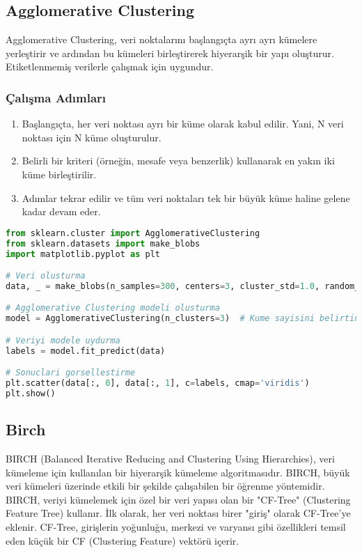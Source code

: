 \subsection{Agglomerative Clustering}
Agglomerative Clustering, veri noktalarını başlangıçta ayrı ayrı kümelere yerleştirir ve ardından bu kümeleri birleştirerek hiyerarşik bir yapı oluşturur. Etiketlenmemiş verilerle çalışmak için uygundur.

\subsubsection{Çalışma Adımları}
\begin{enumerate}
    \item Başlangıçta, her veri noktası ayrı bir küme olarak kabul edilir. Yani, N veri noktası için N küme oluşturulur.
    \item Belirli bir kriteri (örneğin, mesafe veya benzerlik) kullanarak en yakın iki küme birleştirilir.
    \item Adımlar tekrar edilir ve tüm veri noktaları tek bir büyük küme haline gelene kadar devam eder.
\end{enumerate}

\begin{lstlisting}[language=Python, caption=Scikit-learn'de AgglomerativeClustering.]
from sklearn.cluster import AgglomerativeClustering
from sklearn.datasets import make_blobs
import matplotlib.pyplot as plt

# Veri olusturma
data, _ = make_blobs(n_samples=300, centers=3, cluster_std=1.0, random_state=42)

# Agglomerative Clustering modeli olusturma
model = AgglomerativeClustering(n_clusters=3)  # Kume sayisini belirtin

# Veriyi modele uydurma
labels = model.fit_predict(data)

# Sonuclari gorsellestirme
plt.scatter(data[:, 0], data[:, 1], c=labels, cmap='viridis')
plt.show()
\end{lstlisting}

\subsection{Birch}
BIRCH (Balanced Iterative Reducing and Clustering Using Hierarchies), veri kümeleme için kullanılan bir hiyerarşik kümeleme algoritmasıdır. BIRCH, büyük veri kümeleri üzerinde etkili bir şekilde çalışabilen bir öğrenme yöntemidir. BIRCH, veriyi kümelemek için özel bir veri yapısı olan bir "CF-Tree" (Clustering Feature Tree) kullanır. İlk olarak, her veri noktası birer "giriş" olarak CF-Tree'ye eklenir. CF-Tree, girişlerin yoğunluğu, merkezi ve varyansı gibi özellikleri temsil eden küçük bir CF (Clustering Feature) vektörü içerir.

